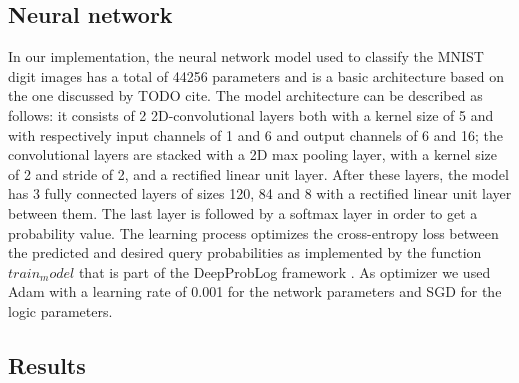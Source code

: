 \subsection{Neural network}
In our implementation, the neural network model used to classify the MNIST digit images has a total of 44256 parameters and is a basic architecture based on the one discussed by TODO cite. The model architecture can be described as follows: it consists of 2 2D-convolutional layers both with a kernel size of 5 and with respectively input channels of 1 and 6 and output channels of 6 and 16; the convolutional layers are stacked with a 2D max pooling layer, with a kernel size of 2 and stride of 2, and a rectified linear unit layer.
After these layers, the model has 3 fully connected layers of sizes 120, 84 and 8 with a rectified linear unit layer between them. The last layer is followed by a softmax layer in order to get a probability value.
The learning process optimizes the cross-entropy loss between the predicted and desired query probabilities as implemented by the function $train_model$ that is part of the DeepProbLog framework \cite{TODO}.
As optimizer we used Adam with a learning rate of 0.001 for the network parameters and SGD for the logic parameters.

\subsection{Results}
